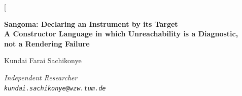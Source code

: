\documentclass[11pt,twocolumn,a4paper]{article}
\theoremstyle{definition}
\theoremstyle{remark}
\begin{document}
\twocolumn[
\begin{@twocolumnfalse}
\begin{center}

{\LARGE\bfseries Sangoma: Declaring an Instrument by its Target\\[4pt]
A Constructor Language in which Unreachability is a Diagnostic,\\
not a Rendering Failure}

\vspace{12pt}

{\large Kundai Farai Sachikonye}

\vspace{6pt}

{\small\itshape Independent Researcher \\[0.3em]
\texttt{kundai.sachikonye@wzw.tum.de}}

\vspace{6pt}{\small August 2026}

\vspace{16pt}


\end{center}
\end{@twocolumnfalse}
\end{document}
